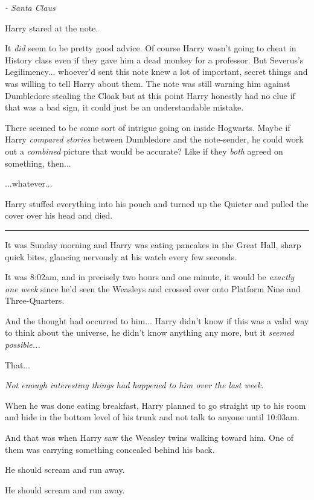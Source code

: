 \emph{- Santa Claus}

Harry stared at the note.

It \emph{did} seem to be pretty good advice. Of course Harry wasn't going to cheat in History class even if they gave him a dead monkey for a professor. But Severus's Legilimency... whoever'd sent this note knew a lot of important, secret things and was willing to tell Harry about them. The note was still warning him against Dumbledore stealing the Cloak but at this point Harry honestly had no clue if that was a bad sign, it could just be an understandable mistake.

There seemed to be some sort of intrigue going on inside Hogwarts. Maybe if Harry \emph{compared stories} between Dumbledore and the note-sender, he could work out a \emph{combined} picture that would be accurate? Like if they \emph{both} agreed on something, then...

...whatever...

Harry stuffed everything into his pouch and turned up the Quieter and pulled the cover over his head and died.

\begin{center}\rule{3in}{0.4pt}\end{center}

It was Sunday morning and Harry was eating pancakes in the Great Hall, sharp quick bites, glancing nervously at his watch every few seconds.

It was 8:02am, and in precisely two hours and one minute, it would be \emph{exactly one week} since he'd seen the Weasleys and crossed over onto Platform Nine and Three-Quarters.

And the thought had occurred to him... Harry didn't know if this was a valid way to think about the universe, he didn't know anything any more, but it \emph{seemed possible...}

That...

\emph{Not enough interesting things had happened to him over the last week.}

When he was done eating breakfast, Harry planned to go straight up to his room and hide in the bottom level of his trunk and not talk to anyone until 10:03am.

And that was when Harry saw the Weasley twins walking toward him. One of them was carrying something concealed behind his back.

He should scream and run away.

He should scream and run away.

